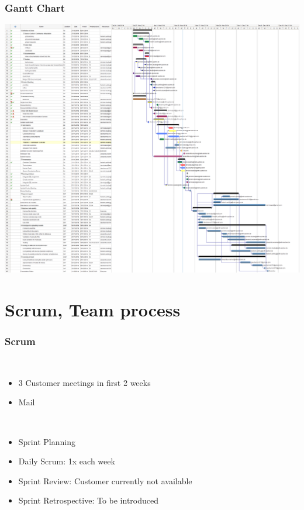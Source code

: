 \begin{frame}
  \frametitle{Gantt Chart}
  \includegraphics[width=1.2\textwidth, height=0.7\textwidth]{images/gantt_chart.png}\\
\end{frame}

\section{Scrum, Team process}

\begin{frame}
  \frametitle{Scrum}
  \begin{description}[]
    \item[Customer contact] \hfill \\
    \begin{itemize}
      \item 3 Customer meetings in first 2 weeks
      \item Mail
    \end{itemize}
  \end{description}
  \begin{description}[]
    \item[Collaborative working] \hfill \\
    \begin{itemize}
      \item Sprint Planning
      \item Daily Scrum: 1x each week
      \item Sprint Review: Customer currently not available
	   \item Sprint Retrospective: To be introduced
    \end{itemize}
  \end{description}
\end{frame}

